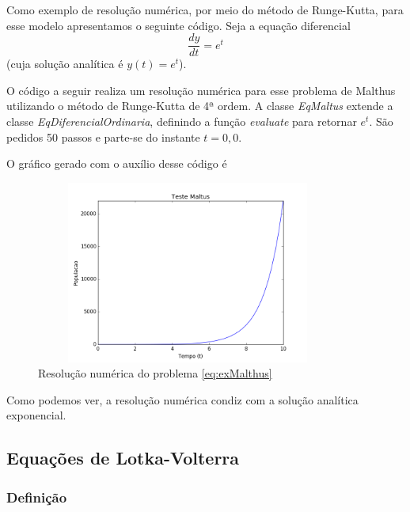             Como exemplo de resolução numérica, por meio do método de Runge-Kutta, para esse modelo apresentamos o seguinte código. Seja a equação diferencial
            \begin{equation}
                \label{eq:exMalthus}
                \dfrac{dy}{dt} = e^t
            \end{equation}
            (cuja solução analítica é $y(t) = e^t$). 
            
            O código a seguir realiza um resolução numérica para esse problema de Malthus utilizando o método de Runge-Kutta de 4ª ordem. A classe \textit{EqMaltus} extende a classe \textit{EqDiferencialOrdinaria}, definindo a função \textit{evaluate} para retornar $e^t$. São pedidos 50 passos e parte-se do instante $t = 0,0$.
            
            
            O gráfico gerado com o auxílio desse código é
            \begin{figure}[H]
                \centering \includegraphics[width=10cm,height=6cm]{resultsCodigos/testeMaltus.png}
                \caption{Resolução numérica do problema \ref{eq:exMalthus}}
                \label{fig:Malthus}
            \end{figure}
            Como podemos ver, a resolução numérica condiz com a solução analítica exponencial.
    
        \subsection{Equações de Lotka-Volterra}
        
            \subsubsection{Definição}
            
